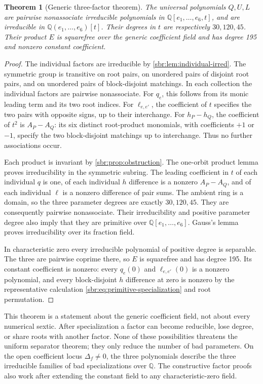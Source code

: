 \documentclass[11pt,letterpaper]{article}
\numberwithin{equation}{section}
\newtheorem{theorem}{Theorem}[section]
\theoremstyle{definition}
\theoremstyle{remark}
\newcommand{\QQ}{\mathbb Q}
\begin{document}
\begin{theorem}[Generic three-factor theorem]
\label{sbr:thm:generic}
The universal polynomials $Q,U,L$ are pairwise nonassociate irreducible
polynomials in $\QQ[e_1,\ldots,e_6,t]$, and are irreducible in
$\QQ(e_1,\ldots,e_6)[t]$. Their degrees in $t$ are respectively
$30,120,45$. Their product $E$ is squarefree over the generic coefficient
field and has degree 195 and nonzero constant coefficient.
\end{theorem}
\begin{proof}
The individual factors are irreducible by \cref{sbr:lem:individual-irred}.
The symmetric group is transitive on root pairs, on unordered pairs of
disjoint root pairs, and on unordered pairs of block-disjoint matchings.
In each collection the individual factors are pairwise nonassociate.
For $q_e$, this follows from its monic leading term and its two root
indices. For $\ell_{e,e'}$, the coefficient of $t$ specifies the two
pairs with opposite signs, up to their interchange. For $h_P-h_Q$, the
coefficient of $t^2$ is $A_P-A_Q$: its six distinct root-product monomials,
with coefficients $+1$ or $-1$, specify the two block-disjoint matchings
up to interchange. Thus no further associations occur.

Each product is invariant by \cref{sbr:prop:obstruction}. The one-orbit
product lemma proves irreducibility in the symmetric subring. The leading
coefficient in $t$ of each individual $q$ is one, of each individual $h$
difference is a nonzero $A_P-A_Q$, and of each individual $\ell$ is a
nonzero difference of pair sums. The ambient ring is a domain, so the
three parameter degrees are exactly $30,120,45$. They are consequently
pairwise nonassociate. Their irreducibility and positive parameter degree
also imply that they are primitive over $\QQ[e_1,\ldots,e_6]$.
Gauss's lemma proves irreducibility over its fraction field.

In characteristic zero every irreducible polynomial of positive degree is
separable. The three are pairwise coprime there, so $E$ is squarefree and
has degree 195. Its constant coefficient is nonzero: every $q_e(0)$ and
$\ell_{e,e'}(0)$ is a nonzero polynomial, and every block-disjoint $h$
difference at zero is nonzero by the representative calculation
\cref{sbr:eq:primitive-specialization} and root permutation.
\end{proof}

This theorem is a statement about the generic coefficient field, not about
every numerical sextic. After specialization a factor can become
reducible, lose degree, or share roots with another factor. None of these
possibilities threatens the uniform separator theorem; they only reduce
the number of bad parameters. On the open coefficient locus
$\Delta_f\ne0$, the three polynomials describe the three irreducible
families of bad specializations over $\QQ$. The constructive factor proofs
also work after extending the constant field to any characteristic-zero
field.
\end{document}
